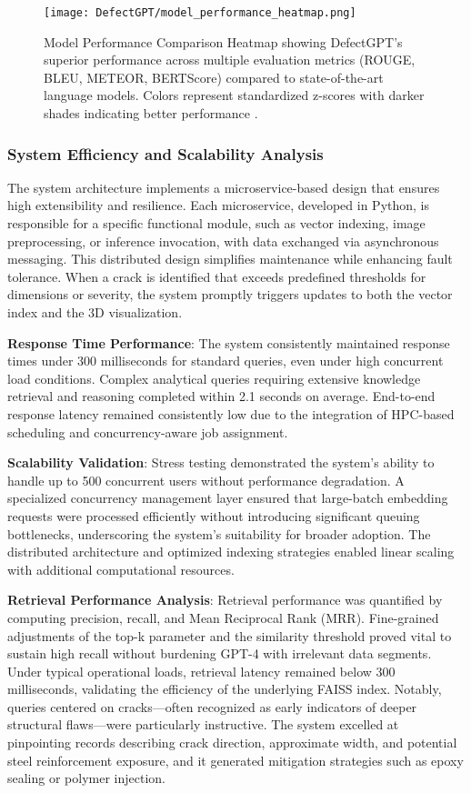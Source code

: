 \begin{figure}[htbp]
    \centering
    \texttt{[image: DefectGPT/model\_performance\_heatmap.png]}
    \caption{Model Performance Comparison Heatmap showing DefectGPT's superior performance across multiple evaluation metrics (ROUGE, BLEU, METEOR, BERTScore) compared to state-of-the-art language models. Colors represent standardized z-scores with darker shades indicating better performance \cite{zhang2024automated}.}
    \label{fig:performance-heatmap}
\end{figure}

\subsubsection{System Efficiency and Scalability Analysis}

The system architecture implements a microservice-based design that ensures high extensibility and resilience. Each microservice, developed in Python, is responsible for a specific functional module, such as vector indexing, image preprocessing, or inference invocation, with data exchanged via asynchronous messaging. This distributed design simplifies maintenance while enhancing fault tolerance. When a crack is identified that exceeds predefined thresholds for dimensions or severity, the system promptly triggers updates to both the vector index and the 3D visualization.

\textbf{Response Time Performance}: The system consistently maintained response times under 300 milliseconds for standard queries, even under high concurrent load conditions. Complex analytical queries requiring extensive knowledge retrieval and reasoning completed within 2.1 seconds on average. End-to-end response latency remained consistently low due to the integration of HPC-based scheduling and concurrency-aware job assignment.

\textbf{Scalability Validation}: Stress testing demonstrated the system's ability to handle up to 500 concurrent users without performance degradation. A specialized concurrency management layer ensured that large-batch embedding requests were processed efficiently without introducing significant queuing bottlenecks, underscoring the system's suitability for broader adoption. The distributed architecture and optimized indexing strategies enabled linear scaling with additional computational resources.

\textbf{Retrieval Performance Analysis}: Retrieval performance was quantified by computing precision, recall, and Mean Reciprocal Rank (MRR). Fine-grained adjustments of the top-k parameter and the similarity threshold proved vital to sustain high recall without burdening GPT-4 with irrelevant data segments. Under typical operational loads, retrieval latency remained below 300 milliseconds, validating the efficiency of the underlying FAISS index. Notably, queries centered on cracks—often recognized as early indicators of deeper structural flaws—were particularly instructive. The system excelled at pinpointing records describing crack direction, approximate width, and potential steel reinforcement exposure, and it generated mitigation strategies such as epoxy sealing or polymer injection.

